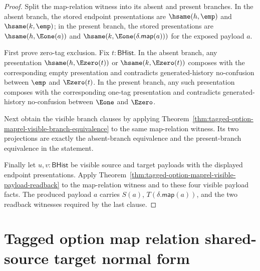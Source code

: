 \begin{proof}
Split the map-relation witness into its absent and present branches. In the
absent branch, the stored endpoint presentations are $\hsame(h,\emp)$ and
$\hsame(k,\emp)$; in the present branch, the stored presentations are
$\hsame(h,\Eone(a))$ and
$\hsame(k,\Eone(\delta.\mathsf{map}(a)))$ for the exposed payload $a$.

First prove zero-tag exclusion. Fix $t:\mathsf{BHist}$. In the absent branch,
any presentation $\hsame(h,\Ezero(t))$ or $\hsame(k,\Ezero(t))$ composes with
the corresponding empty presentation and contradicts generated-history
no-confusion between $\emp$ and $\Ezero(t)$. In the present branch, any such
presentation composes with the corresponding one-tag presentation and
contradicts generated-history no-confusion between $\Eone$ and $\Ezero$.

Next obtain the visible branch clauses by applying
Theorem~\ref{thm:tagged-option-maprel-visible-branch-equivalence} to the same
map-relation witness. Its two projections are exactly the absent-branch
equivalence and the present-branch equivalence in the statement.

Finally let $u,v:\mathsf{BHist}$ be visible source and target payloads with the
displayed endpoint presentations. Apply
Theorem~\ref{thm:tagged-option-maprel-visible-payload-readback} to the
map-relation witness and to these four visible payload facts. The produced
payload $a$ carries $S(a)$, $T(\delta.\mathsf{map}(a))$, and the two readback
witnesses required by the last clause.
\end{proof}

\section{Tagged option map relation shared-source target normal form}
\label{sec:option-maprel-shared-source-target-normal-form}


